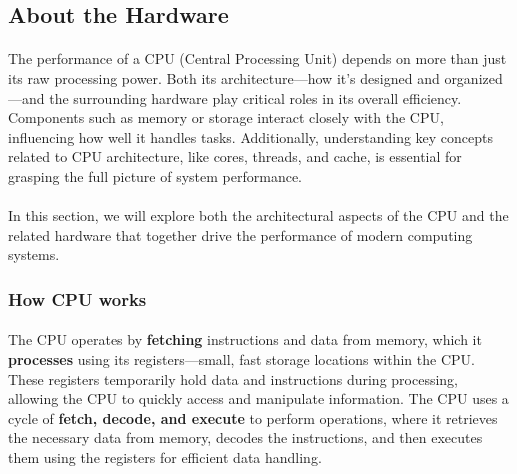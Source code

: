 \subsection{About the Hardware}

    \paragraph*{}
    The performance of a CPU (Central Processing Unit) depends on more than just its raw processing power. 
    Both its architecture—how it’s designed and organized—and the surrounding hardware play critical roles in 
    its overall efficiency. Components such as memory or storage interact closely with the CPU, influencing how well 
    it handles tasks. Additionally, understanding key concepts related to CPU architecture, like cores, threads, and cache, 
    is essential for grasping the full picture of system performance. 
    \par

    \paragraph*{}
    In this section, we will explore both the architectural aspects of the CPU and the related hardware that together 
    drive the performance of modern computing systems.
    \par



\subsubsection{How CPU works}

    \paragraph*{}
    The CPU operates by \textbf{fetching} instructions and data from memory, which it \textbf{processes} using its registers—small, 
    fast storage locations within the CPU. These registers temporarily hold data and instructions during processing, 
    allowing the CPU to quickly access and manipulate information. The CPU uses a cycle of \textbf{fetch, decode, and execute} 
    to perform operations, where it retrieves the necessary data from memory, decodes the instructions, and then executes 
    them using the registers for efficient data handling.
    \par

